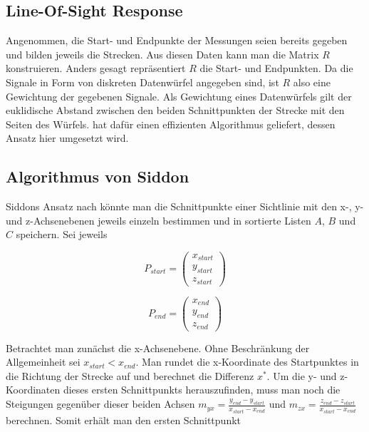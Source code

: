 \subsection{Line-Of-Sight Response}

Angenommen, die Start- und Endpunkte der Messungen seien bereits gegeben und bilden jeweils die Strecken. Aus diesen Daten kann man die Matrix $R$ konstruieren. Anders gesagt repräsentiert $R$ die Start- und Endpunkten. Da die Signale in Form von diskreten Datenwürfel angegeben sind, ist $R$ also eine Gewichtung der gegebenen Signale. Als Gewichtung eines Datenwürfels gilt der euklidische Abstand zwischen den beiden Schnittpunkten der Strecke mit den Seiten des Würfels. \textcite{k4.2.siddon} hat dafür einen effizienten Algorithmus geliefert, dessen Ansatz hier umgesetzt wird.


\subsection{Algorithmus von Siddon}\label{k4.2.ct.siddon}

Siddons Ansatz nach könnte man die Schnittpunkte einer Sichtlinie mit den x-, y- und z-Achsenebenen jeweils einzeln bestimmen und in sortierte Listen $A$, $B$ und $C$ speichern. Sei jeweils

\begin{equation}
  P_{start} = \begin{pmatrix}x_{start} \\ y_{start} \\ z_{start}\end{pmatrix}
\end{equation}

\begin{equation}
  P_{end} = \begin{pmatrix}x_{end} \\ y_{end} \\ z_{end}\end{pmatrix}
\end{equation}

Betrachtet man zunächst die x-Achsenebene. Ohne Beschränkung der Allgemeinheit sei $x_{start} < x_{end}$. Man rundet die x-Koordinate des Startpunktes in die Richtung der Strecke auf und berechnet die Differenz $x^{\ast}$. Um die y- und z-Koordinaten dieses ersten Schnittpunkts herauszufinden, muss man noch die Steigungen gegenüber dieser beiden Achsen $m_{yx} = \frac{y_{end} - y_{start}}{x_{start} - x_{end}}$ und $m_{zx} = \frac{z_{end} - z_{start}}{x_{start} - x_{end}}$ berechnen. Somit erhält man den ersten Schnittpunkt

